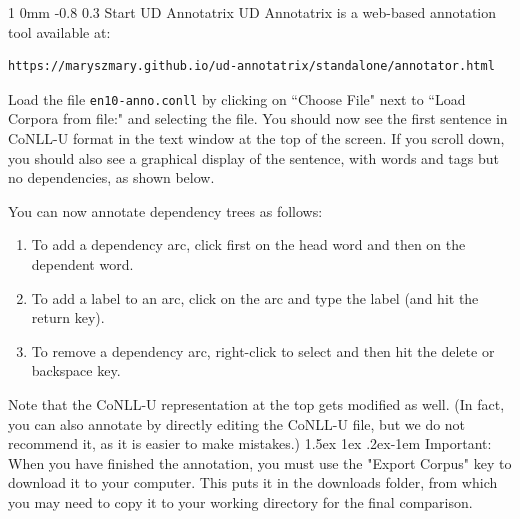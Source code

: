 \documentclass[10.9pt]{article}
\makeatletter
\newcommand{\newsec}[2]{\section{#1}\label{sec:#2}\noindent}
\renewcommand{\section}{\@startsection
{section}%
{1}%
{0mm}%
{-0.8\baselineskip}%
{0.3\baselineskip}%
{\bfseries\large}}%
\renewcommand{\paragraph}{%
  \@startsection{paragraph}{4}%
  {\z@}{1.5ex \@plus 1ex \@minus .2ex}{-1em}%
  {\normalfont\normalsize\bfseries}%
}\makeatother
\makeatother
\begin{document}
\newsec{Start UD Annotatrix}{brat}%
UD Annotatrix is a web-based annotation tool available at: 
\begin{verbatim}
https://maryszmary.github.io/ud-annotatrix/standalone/annotator.html
\end{verbatim}
Load the file {\tt en10-anno.conll} by clicking on ``Choose File" next to ``Load Corpora from file:" and selecting the file. 
You should now see the first sentence in CoNLL-U format in the text window at the top of the screen. 
If you scroll down, you should also see a graphical display of the sentence, with words and tags but no dependencies, as shown below.
\begin{center}
\end{center}
You can now annotate dependency trees as follows:
\begin{enumerate}[topsep=5pt,noitemsep]
\item To add a dependency arc, click first on the head word and then on the dependent word.
\item To add a label to an arc, click on the arc and type the label (and hit the return key).
\item To remove a dependency arc, right-click to select and then hit the delete or backspace key.
\end{enumerate}
Note that the CoNLL-U representation at the top gets modified as well. (In fact, you can also annotate by directly editing the CoNLL-U file, but we do not recommend it, as it is easier to make mistakes.) \paragraph{Important:} When you have finished the annotation, you must use the "Export Corpus" key to download it to your computer. This puts it in the downloads folder, from which you may need to copy it to your working directory for the final comparison. 
\end{document}
